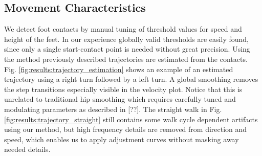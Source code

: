 \subsection{Movement Characteristics}


We detect foot contacts by manual tuning of threshold values for speed and height of the feet. In our experience globally valid thresholds are easily found, since only a single start-contact point is needed without great precision. Using the method previously described trajectories are estimated from the contacts. Fig. \ref{fig:results:trajectory_estimation} shows an example of an estimated trajectory using a right turn followed by a left turn. A global smoothing removes the step transitions especially visible in the velocity plot. Notice that this is unrelated to traditional hip smoothing which requires carefully tuned and modulating parameters as described in [??]. The straight walk in Fig. \ref{fig:results:trajectory_straight} still contains some walk cycle dependent artifacts using our method, but high frequency details are removed from direction and speed, which enables us to apply adjustment curves without masking away needed details. 

